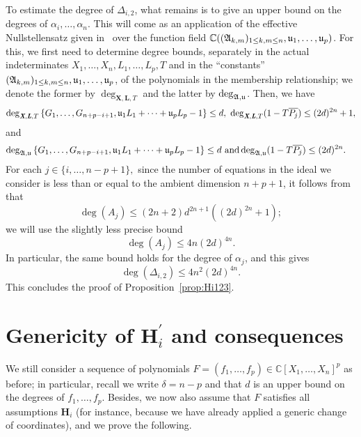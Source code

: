 \documentclass[12pt]{article}
\def\A{\mathfrak{A}}
\def\Lb{\textit{\textbf{L}}}
\def\Xb{\textit{\textbf{X}}}
\def\pjb{\overline{P_{j}}}
\def\D{\Delta}
\def\C{\mathbb{C}}
\begin{document}
\noindent
To estimate the degree of $\D_{i,2}$, what remains is to give an upper
bound on the degrees of $\alpha_i,\dots,\alpha_n$. This will come as
an application of the effective Nullstellensatz given in~\cite{EN}
over the function field $\C((\A_{k,m})_{1 \le k,m \le n},\frak
u_1,\dots,\frak u_p)$. For this, we first need to determine degree
bounds, separately in the actual indeterminates $
X_1,\dots,X_n,L_1,\dots,L_p,T$ and in the ``constants'' $(\A_{k,m})_{1
  \le k,m \le n},\frak u_1,\dots,\frak u_p$, of the polynomials in the
membership relationship; we denote the former by $\deg_{\bm X, \bm L,
  T}$ and the latter by $\deg_{\A,\frak u}$. Then, we have
\begin{align*}
\deg_{\Xb,\Lb,T}
\left\{ G_1,\dots,G_{n+p-i+1}, \frak u_1 L_1 + \cdots + \frak u_p L_p-1\right\}
\leq d, ~
\deg_{\Xb,\Lb,T}(1-T\pjb) \leq (2d)^{2n} +1, 
\end{align*}
and 
\begin{align*}
\deg_{\A,\frak u}  
\left\{  G_1,\dots,G_{n+p-i+1}, \frak u_1 L_1 + \cdots + \frak u_p L_p-1\right\} 
\leq d~\textrm{and}
\deg_{\A,\frak u}(1-T\pjb)& \leq (2d)^{2n}.
\end{align*}
For each $j \in \{i,\hdots,n-p+1\},$ since the number of equations in
the ideal we consider is less than or equal to the ambient dimension $n+p+1$,
it follows from \cite[Theorem 0.5]{EN} that
\[
\deg(A_j)  \le (2n+2)d^{2n+1}((2d)^{2n}+1);
\]
we will use the slightly less precise bound \[\deg(A_j) \le
4n(2d)^{4n}.\] In particular, the same bound holds for the degree
of $\alpha_j$, and this gives
\[\deg(\D_{i,2}) \le 4n^2(2d)^{4n}.\]
This concludes the proof of Proposition~\ref{prop:Hi123}.


\section{Genericity of $\textbf{H}_i^{'}$ and consequences}\label{Sec:Hip}

We still consider a sequence of polynomials $F= (f_1,\hdots,f_p) \in
\C[X_1,\hdots,X_n]^p$ as before; in particular, recall we write
$\delta = n-p$ and that $d$ is an upper bound on the degrees of
$f_1,\dots,f_p$.  Besides, we now also assume that $F$ satisfies all
assumptions $\bm H_i$ (for instance, because we have already applied a
generic change of coordinates), and we prove the following.
\end{document}
